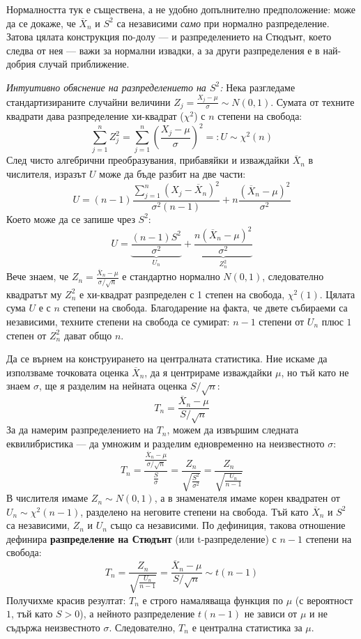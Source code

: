 Нормалността тук е съществена, а не удобно допълнително предположение: може да се докаже, че
$\overline{X}_n$ и $S^2$ са независими \emph{само} при нормално разпределение. Затова цялата
конструкция по-долу — и разпределението на Стюдънт, което следва от нея — важи за нормални
извадки, а за други разпределения е в най-добрия случай приближение.

\emph{Интуитивно обяснение на разпределението на $S^2$:}
Нека разгледаме стандартизираните случайни величини $Z_j = \frac{X_j - \mu}{\sigma} \sim N(0,1)$. Сумата от техните квадрати дава разпределение хи-квадрат ($\chi^2$) с $n$ степени на свобода:
\[
\sum_{j=1}^n Z_j^2 = \sum_{j=1}^n \left( \frac{X_j - \mu}{\sigma} \right)^2 =: U \sim \chi^2(n)
\]
След чисто алгебрични преобразувания, прибавяйки и изваждайки $\overline{X}_n$ в числителя, изразът $U$ може да бъде разбит на две части:
\[
U = (n-1)\frac{\sum_{j=1}^n (X_j - \overline{X}_n)^2}{\sigma^2(n-1)} + n\frac{(\overline{X}_n - \mu)^2}{\sigma^2}
\]
Което може да се запише чрез $S^2$:
\[
U = \underbrace{\frac{(n-1)S^2}{\sigma^2}}_{U_n} + \underbrace{\frac{n(\overline{X}_n - \mu)^2}{\sigma^2}}_{Z_n^2}
\]
Вече знаем, че $Z_n = \frac{\overline{X}_n - \mu}{\sigma/\sqrt{n}}$ е стандартно нормално $N(0,1)$, следователно квадратът му $Z_n^2$ е хи-квадрат разпределен с 1 степен на свобода, $\chi^2(1)$. Цялата сума $U$ е с $n$ степени на свобода. Благодарение на факта, че двете събираеми са независими, техните степени на свобода се сумират: $n-1$ степени от $U_n$ плюс $1$ степен от $Z_n^2$ дават общо $n$.

Да се върнем на конструирането на централната статистика. Ние искаме да използваме точковата оценка $\overline{X}_n$, да я центрираме изваждайки $\mu$, но тъй като не знаем $\sigma$, ще я разделим на нейната оценка $S / \sqrt{n}$:
\[
T_n = \frac{\overline{X}_n - \mu}{S / \sqrt{n}}
\]
За да намерим разпределението на $T_n$, можем да извършим следната еквилибристика — да умножим и разделим едновременно на неизвестното $\sigma$:
\[
T_n = \frac{\frac{\overline{X}_n - \mu}{\sigma / \sqrt{n}}}{\frac{S}{\sigma}} = \frac{Z_n}{\sqrt{\frac{S^2}{\sigma^2}}} = \frac{Z_n}{\sqrt{\frac{U_n}{n-1}}}
\]
В числителя имаме $Z_n \sim N(0,1)$, а в знаменателя имаме корен квадратен от $U_n \sim \chi^2(n-1)$, разделено на неговите степени на свобода. Тъй като $\overline{X}_n$ и $S^2$ са независими, $Z_n$ и $U_n$ също са независими. По дефиниция, такова отношение дефинира \textbf{разпределение на Стюдънт} (или t-разпределение) с $n-1$ степени на свобода:
\[
T_n = \frac{Z_n}{\sqrt{\frac{U_n}{n-1}}} = \frac{\overline{X}_n - \mu}{S/\sqrt{n}} \sim t(n-1)
\]
Получихме красив резултат: $T_n$ е строго намаляваща функция по $\mu$ (с вероятност
$1$, тъй като $S>0$), а нейното разпределение $t(n-1)$ не зависи от $\mu$ и не съдържа неизвестното $\sigma$. Следователно, $T_n$ е централна статистика за $\mu$.

